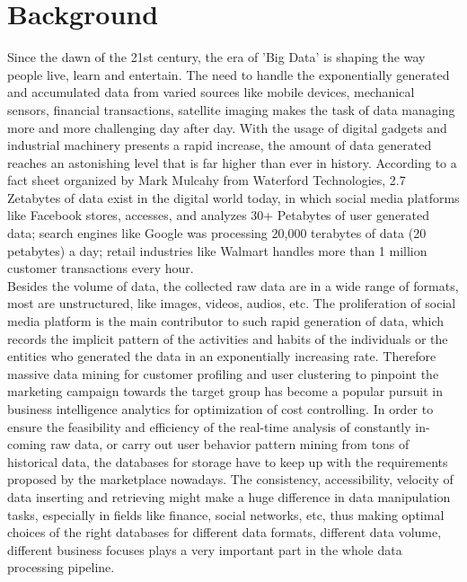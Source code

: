 \section{Background}


Since the dawn of the 21st century, the era of 'Big Data' is shaping the way people live, learn and entertain. 
The need to handle the exponentially generated and accumulated data from varied sources like mobile devices, mechanical sensors, financial transactions,
satellite imaging makes the task of data managing more and more challenging
day after day. 
With the usage of digital gadgets and industrial machinery presents a rapid increase, the amount of data generated reaches an astonishing level that is far higher than ever in history. 
According to a fact sheet organized by Mark Mulcahy \cite{factsheet} from Waterford Technologies, 2.7 Zetabytes of data exist in the digital world today, in which social media platforms like Facebook stores, accesses, and analyzes 30+ Petabytes of user generated data; search engines like Google was processing 20,000 terabytes of data (20 petabytes) a day; retail industries like Walmart handles more than 1 million customer transactions every hour. \\

\noindent Besides the volume of data, the collected raw data are in a wide range of
formats, most are unstructured, like images, videos, audios, etc. The proliferation of social media platform is the main contributor to such rapid generation of data, which records the implicit pattern of the activities and habits of the individuals or the entities who generated the data in an exponentially increasing rate. Therefore massive data mining for customer profiling and user clustering to pinpoint the marketing campaign towards the target group has become a popular pursuit in business intelligence analytics for optimization of cost controlling. In order to ensure the feasibility and efficiency of the real-time analysis of constantly in-coming raw data, or carry out user behavior pattern mining from tons of historical data, the databases for storage have to keep up with the requirements proposed by the marketplace nowadays. The consistency,
accessibility, velocity of data inserting and retrieving might make a
huge difference in data manipulation tasks, especially in
fields like finance, social networks, etc, thus making optimal choices
of the right databases for different data formats, different data volume,
different business focuses plays a very
important part in the whole data processing pipeline.



